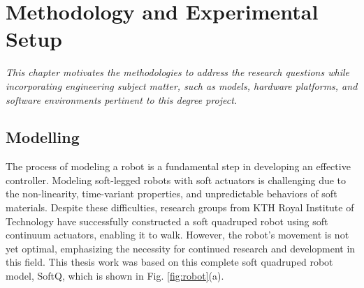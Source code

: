 \chapter{Methodology and Experimental Setup}
\label{chap3}
\textit{This chapter motivates the methodologies to address the research questions while incorporating engineering subject matter, such as models, hardware platforms, and software environments pertinent to this degree project.} 

\section{Modelling}
The process of modeling a robot is a fundamental step in developing an effective controller. Modeling soft-legged robots with soft actuators is challenging due to the non-linearity, time-variant properties, and unpredictable behaviors of soft materials. Despite these difficulties, research groups from KTH Royal Institute of Technology\cite{jiSynthesizingOptimalGait2022, daneliaStructureGaitOptimizationof2021, thorapallimuralidharanContinuumActuatorBased2020, jiLearningbasedControl4D2022} have successfully constructed a soft quadruped robot using soft continuum actuators, enabling it to walk. However, the robot's movement is not yet optimal, emphasizing the necessity for continued research and development in this field. This thesis work was based on this complete soft quadruped robot model, SoftQ, which is shown in Fig. \ref{fig:robot}(a). 

